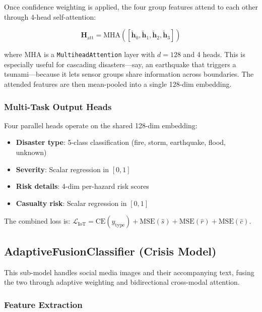 \documentclass[journal]{IEEEtran}
\begin{document}
Once confidence weighting is applied, the four group features attend to each other through 4-head self-attention:

\begin{equation}
\mathbf{H}_\text{att} = \text{MHA}([\tilde{\mathbf{h}}_0, \tilde{\mathbf{h}}_1, \tilde{\mathbf{h}}_2, \tilde{\mathbf{h}}_3])
\end{equation}

where $\text{MHA}$ is a \texttt{MultiheadAttention} layer with $d=128$ and 4 heads. This is especially useful for cascading disasters---say, an earthquake that triggers a tsunami---because it lets sensor groups share information across boundaries. The attended features are then mean-pooled into a single 128-dim embedding.

\subsubsection{Multi-Task Output Heads}

Four parallel heads operate on the shared 128-dim embedding:

\begin{itemize}
    \item \textbf{Disaster type}: 5-class classification (fire, storm, earthquake, flood, unknown)
    \item \textbf{Severity}: Scalar regression in $[0, 1]$
    \item \textbf{Risk details}: 4-dim per-hazard risk scores
    \item \textbf{Casualty risk}: Scalar regression in $[0, 1]$
\end{itemize}

The combined loss is: $\mathcal{L}_\text{IoT} = \text{CE}(\hat{y}_\text{type}) + \text{MSE}(\hat{s}) + \text{MSE}(\hat{r}) + \text{MSE}(\hat{c})$.

\subsection{AdaptiveFusionClassifier (Crisis Model)}

This sub-model handles social media images and their accompanying text, fusing the two through adaptive weighting and bidirectional cross-modal attention.

\subsubsection{Feature Extraction}
\end{document}
